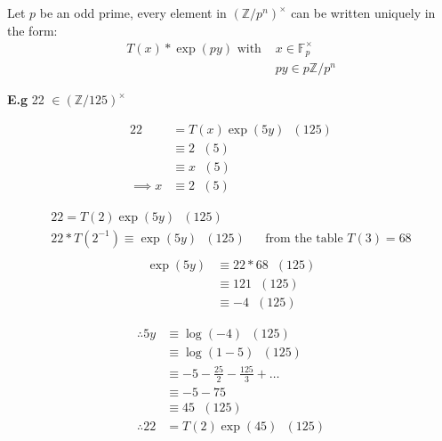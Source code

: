 \documentclass[11pt]{article}
\begin{document}
\begin{corollary}
	Let $p$ be an odd prime, every element in $(\mathbb{Z}/p^n)^\times$ can be written uniquely in the form:
	\begin{align*}
		T(x) * \exp(py) \text{ with } &x \in \mathbb{F}_p^\times \\
		&py \in p\mathbb{Z}/p^n
	\end{align*}
\end{corollary}

\newpage 
\textbf{E.g} 22 $\in (\mathbb{Z}/125)^\times$

\begin{align*}
	22 &= T(x) \exp(5y) \hspace{7pt} (125)\\
	&\equiv 2\hspace{7pt}(5)  \\ 
	&\equiv x \hspace{7pt} (5)\\[1em]
	\implies x &\equiv 2 \hspace{7pt} (5)
\end{align*}

\begin{align*}
	22 = T(2)\exp(5y)\hspace{7pt} (125)\\
	 22*T(2^{-1}) \equiv \exp(5y) \hspace{7pt} (125) && \text{from the table $T(3) = 68$}\\[1em]
\end{align*}
\begin{align*}
	\exp(5y) &\equiv 22*68 \hspace{7pt} (125)\\
	&\equiv 121 \hspace{7pt} (125)\\
	&\equiv -4 \hspace{7pt} (125)
\end{align*}


\begin{align*}
	\therefore 5y &\equiv \log(-4) \hspace{7pt} (125)\\
	&\equiv \log(1-5) \hspace{7pt} (125)\\
	&\equiv -5 - \frac{25}{2} - \frac{125}{3} + \dots\\
	&\equiv -5 - 75\\
	&\equiv 45 \hspace{7pt} (125)\\[2em]
	\therefore 22 &= T(2)\exp(45) \hspace{7pt} (125)
\end{align*}
\end{document}
